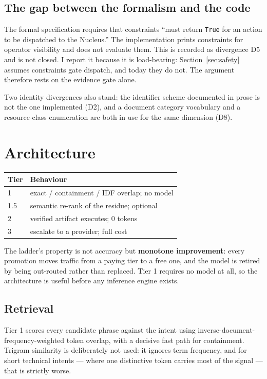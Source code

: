 \documentclass[11pt,twocolumn]{article}
\begin{document}
\subsection{The gap between the formalism and the code}

The formal specification requires that constraints ``must return \texttt{True}
for an action to be dispatched to the Nucleus.'' The implementation prints
constraints for operator visibility and does not evaluate them. This is recorded
as divergence D5 and is not closed. I report it because it is load-bearing:
Section~\ref{sec:safety} assumes constraints gate dispatch, and today they do
not. The argument therefore rests on the evidence gate alone.

Two identity divergences also stand: the identifier scheme documented in prose
is not the one implemented (D2), and a document category vocabulary and a
resource-class enumeration are both in use for the same dimension (D8).

\section{Architecture}

\begin{center}
\small
\begin{tabular}{@{}ll@{}}
\toprule
\textbf{Tier} & \textbf{Behaviour} \\
\midrule
1 & exact / containment / IDF overlap; no model \\
1.5 & semantic re-rank of the residue; optional \\
2 & verified artifact executes; 0 tokens \\
3 & escalate to a provider; full cost \\
\bottomrule
\end{tabular}
\normalsize
\end{center}

The ladder's property is not accuracy but \textbf{monotone improvement}: every
promotion moves traffic from a paying tier to a free one, and the model is
retired by being out-routed rather than replaced. Tier 1 requires no model at
all, so the architecture is useful before any inference engine exists.

\subsection{Retrieval}

Tier 1 scores every candidate phrase against the intent using
inverse-document-frequency-weighted token overlap, with a decisive fast path for
containment. Trigram similarity is deliberately not used: it ignores term
frequency, and for short technical intents --- where one distinctive token
carries most of the signal --- that is strictly worse.
\end{document}
